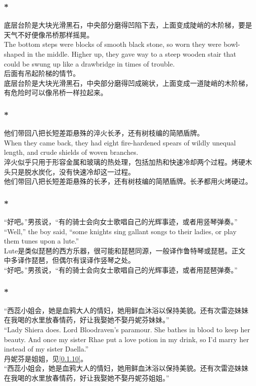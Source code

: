 \documentclass[12pt,a4paper]{article}
\newcommand{\h}[1]{{\color{red}#1}\\}
\newcommand{\la}[1]{{\color{blue}#1}\\}
\begin{document}
\subsubsection{\color{red}*}\label{0.2.4}\la{
	底层台阶是大块光滑黑石，中央部分磨得凹陷下去，上面变成陡峭的木阶梯，要是天气不好便像吊桥那样摇晃。\\
	The bottom steps were blocks of smooth black stone, so worn they were bowl-shaped in the middle. Higher up, they gave way to a steep wooden stair that could be swung up like a drawbridge in times of trouble.}\h{
	后面有吊起阶梯的情节。}
	底层台阶是大块光滑黑石，中央部分磨得凹成碗状，上面变成一道陡峭的木阶梯，有危险时可以像吊桥一样拉起来。
	
\subsubsection{\color{red}*}\label{0.2.5}\la{														他们带回八把长短差距悬殊的淬火长矛，还有树枝编的简陋盾牌。\\
	When they came back, they had eight fire-hardened spears of wildly unequal length, and crude shields of woven branches. }\h{
	淬火似乎只用于形容金属和玻璃的热处理，包括加热和快速冷却两个过程。烤硬木头只是脱水炭化，没有快速冷却这一过程。}
	他们带回八把长短差距悬殊的长矛，还有树枝编的简陋盾牌。长矛都用火烤硬过。

\subsubsection{\color{red}*}\la{
	“好吧。”男孩说，“有的骑士会向女士歌唱自己的光辉事迹，或者用竖琴弹奏。” \\
	“Well,” the boy said, “some knights sing gallant songs to their ladies, or play them tunes upon a lute.”}\h{
	Lute是类似琵琶的西方乐器，很可能和琵琶同源，一般译作鲁特琴或琵琶。正文中多译作琵琶，但偶尔有误译作竖琴之处。}
	“好吧。”男孩说，“有的骑士会向女士歌唱自己的光辉事迹，或者用琵琶弹奏。”
	
\subsubsection{\color{red}*}\la{
	“西蕊小姐会，她是血鸦大人的情妇，她用鲜血沐浴以保持美貌。还有次雷迩妹妹在我喝的水里放春情药，好让我娶她不娶丹妮芬妹妹。” \\
	“Lady Shiera does. Lord Bloodraven's paramour. She bathes in blood to keep her beauty. And once my sister Rhae put a love potion in my drink, so I'd marry her instead of my sister Daella.”}\h{
	丹妮芬是姐姐，见\ref{0.1.10}。}
		“西蕊小姐会，她是血鸦大人的情妇，她用鲜血沐浴以保持美貌。还有次雷迩妹妹在我喝的水里放春情药，好让我娶她不娶丹妮芬姐姐。”
		
\end{document}
